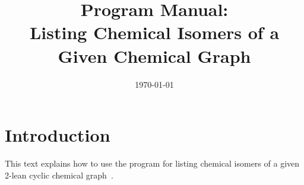 \documentclass[11pt,titlepage,dvipdfmx,twoside]{article}
\title{\Huge{
Program Manual: \\
Listing Chemical Isomers of a Given Chemical Graph}}
\begin{document}

\date{\today}

\maketitle


\thispagestyle{empty}
\tableofcontents
\clearpage



\section{Introduction}
\label{sec:intro}

This text explains how to use the program for listing
chemical isomers of a given 2-lean cyclic chemical graph~\cite{branch}.
\end{document}
